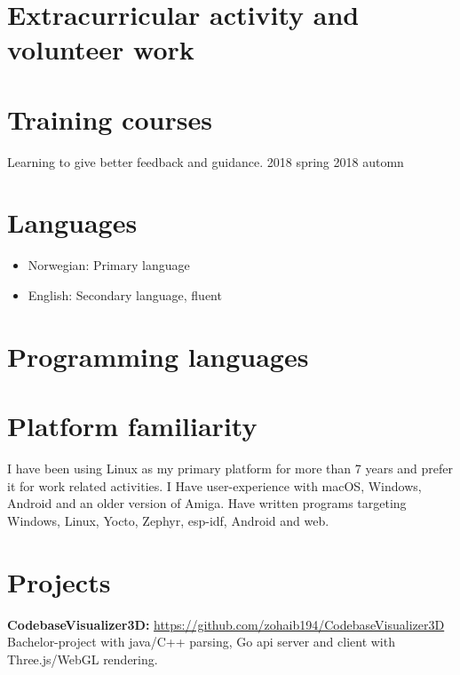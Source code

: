 \documentclass[british]{../crudecv/crudecv}
\begin{document}
\section*{Extracurricular activity and volunteer work}
\begin{experiences}
\end{experiences}

\section*{Training courses}
\begin{experiences}
  {
    Learning to give better feedback and guidance.
  }{
    2018 spring
  }{
    2018 automn
  }
\end{experiences}

\section*{Languages}
\begin{itemize}
\item Norwegian: Primary language
\item English: Secondary language, fluent
\end{itemize}


\section*{Programming languages}
\begin{skills}
\end{skills}


\section*{Platform familiarity}
I have been using Linux as my primary platform for more than 7 years and
prefer it for work related activities. I Have user-experience with macOS,
Windows, Android and an older version of Amiga. Have written programs
targeting Windows, Linux, Yocto, Zephyr, esp-idf, Android and web.

\section*{Projects}
\textbf{CodebaseVisualizer3D:} \hfill \href{https://github.com/zohaib194/CodebaseVisualizer3D}{https://github.com/zohaib194/CodebaseVisualizer3D} \\
Bachelor-project with java/C++ parsing, Go api server and client with Three.js/WebGL rendering.
\end{document}
